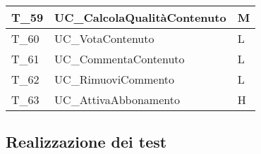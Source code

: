 \begin{longtable}{| p{} | p{} | p{} |}
    T\_59            & UC\_CalcolaQualitàContenuto           & M                 \\\hline
    T\_60            & UC\_VotaContenuto                     & L                 \\\hline
    T\_61            & UC\_CommentaContenuto                 & L                 \\\hline
    T\_62            & UC\_RimuoviCommento                   & L                 \\\hline
    T\_63            & UC\_AttivaAbbonamento                 & H                 \\\hline
\end{longtable}

\subsection{Realizzazione dei test}

